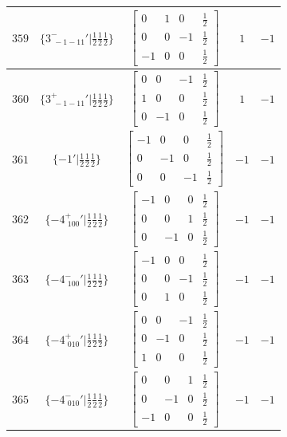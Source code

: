 \documentclass[fleqn,8pt]{jsarticle}
\begin{document}
\begin{longtable}{ccccc}
$ 359 $ & $ \{3^{-}_{\,\,-1-11}{}'|\frac{1}{2} \frac{1}{2} \frac{1}{2}\} $ & $ \begin{bmatrix} 0 & 1 & 0 & \frac{1}{2} \\ 0 & 0 & -1 & \frac{1}{2} \\ -1 & 0 & 0 & \frac{1}{2} \end{bmatrix} $ & $ 1 $ & $ -1 $ \\ \hline
$ 360 $ & $ \{3^{+}_{\,\,-1-11}{}'|\frac{1}{2} \frac{1}{2} \frac{1}{2}\} $ & $ \begin{bmatrix} 0 & 0 & -1 & \frac{1}{2} \\ 1 & 0 & 0 & \frac{1}{2} \\ 0 & -1 & 0 & \frac{1}{2} \end{bmatrix} $ & $ 1 $ & $ -1 $ \\ \hline
$ 361 $ & $ \{-1{}'|\frac{1}{2} \frac{1}{2} \frac{1}{2}\} $ & $ \begin{bmatrix} -1 & 0 & 0 & \frac{1}{2} \\ 0 & -1 & 0 & \frac{1}{2} \\ 0 & 0 & -1 & \frac{1}{2} \end{bmatrix} $ & $ -1 $ & $ -1 $ \\ \hline
$ 362 $ & $ \{-4^{+}_{\,\,100}{}'|\frac{1}{2} \frac{1}{2} \frac{1}{2}\} $ & $ \begin{bmatrix} -1 & 0 & 0 & \frac{1}{2} \\ 0 & 0 & 1 & \frac{1}{2} \\ 0 & -1 & 0 & \frac{1}{2} \end{bmatrix} $ & $ -1 $ & $ -1 $ \\ \hline
$ 363 $ & $ \{-4^{-}_{\,\,100}{}'|\frac{1}{2} \frac{1}{2} \frac{1}{2}\} $ & $ \begin{bmatrix} -1 & 0 & 0 & \frac{1}{2} \\ 0 & 0 & -1 & \frac{1}{2} \\ 0 & 1 & 0 & \frac{1}{2} \end{bmatrix} $ & $ -1 $ & $ -1 $ \\ \hline
$ 364 $ & $ \{-4^{+}_{\,\,010}{}'|\frac{1}{2} \frac{1}{2} \frac{1}{2}\} $ & $ \begin{bmatrix} 0 & 0 & -1 & \frac{1}{2} \\ 0 & -1 & 0 & \frac{1}{2} \\ 1 & 0 & 0 & \frac{1}{2} \end{bmatrix} $ & $ -1 $ & $ -1 $ \\ \hline
$ 365 $ & $ \{-4^{-}_{\,\,010}{}'|\frac{1}{2} \frac{1}{2} \frac{1}{2}\} $ & $ \begin{bmatrix} 0 & 0 & 1 & \frac{1}{2} \\ 0 & -1 & 0 & \frac{1}{2} \\ -1 & 0 & 0 & \frac{1}{2} \end{bmatrix} $ & $ -1 $ & $ -1 $ \\ \hline

\end{longtable}
\end{document}
